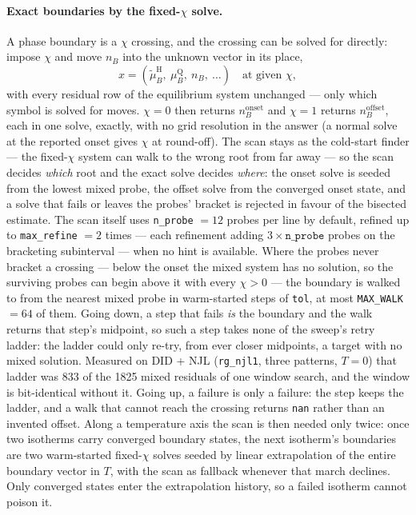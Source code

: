 \documentclass[aps,prc,onecolumn,superscriptaddress,nofootinbib,10pt]{revtex4-2}
\newcommand{\nB}{n_B}
\newcommand{\muB}{\mu_B}
\newcommand{\mutB}{\tilde\mu_B}
\newcommand{\phH}{\mathrm{H}}
\newcommand{\phQ}{\mathrm{Q}}
\begin{document}
\paragraph{Exact boundaries by the fixed-$\chi$ solve.} A phase boundary is a
$\chi$ crossing, and the crossing can be solved for directly: impose $\chi$
and move $\nB$ into the unknown vector in its place,
%
\begin{equation}
x = (\mutB^\phH,\ \muB^\phQ,\ \nB,\ \ldots) \quad \text{at given } \chi ,
\end{equation}
%
with every residual row of the equilibrium system unchanged --- only which
symbol is solved for moves. $\chi = 0$ then returns
$\nB^{\mathrm{onset}}$ and $\chi = 1$ returns $\nB^{\mathrm{offset}}$, each in
one solve, exactly, with no grid resolution in the answer (a normal solve at
the reported onset gives $\chi$ at round-off). The scan stays as the
cold-start finder --- the fixed-$\chi$ system can walk to the wrong root from
far away --- so the scan decides \emph{which} root and the exact solve
decides \emph{where}: the onset solve is seeded from the lowest mixed probe,
the offset solve from the converged onset state, and a solve that fails or
leaves the probes' bracket is rejected in favour of the bisected estimate. The
scan itself uses \texttt{n\_probe} $= 12$ probes per line by default, refined up
to \texttt{max\_refine} $= 2$ times --- each refinement adding
$3 \times \texttt{n\_probe}$ probes on the bracketing subinterval --- when no
hint is available. Where the probes never bracket a crossing --- below the
onset the mixed system has no solution, so the surviving probes can begin
above it with every $\chi > 0$ --- the boundary is walked to from the nearest
mixed probe in warm-started steps of \texttt{tol}, at most
\texttt{MAX\_WALK} $= 64$ of them. Going down, a step that fails \emph{is}
the boundary and the walk returns that step's midpoint, so such a step takes
none of the sweep's retry ladder: the ladder could only re-try, from ever
closer midpoints, a target with no mixed solution. Measured on DID + NJL
(\texttt{rg\_njl1}, three patterns, $T = 0$) that ladder was 833 of the 1825
mixed residuals of one window search, and the window is bit-identical without
it. Going up, a failure is only a failure: the step keeps the ladder, and a
walk that cannot reach the crossing returns \texttt{nan} rather than an
invented offset.
Along a temperature axis the scan is then needed only twice: once two
isotherms carry converged boundary states, the next isotherm's boundaries are
two warm-started fixed-$\chi$ solves seeded by linear extrapolation of the
entire boundary vector in $T$, with the scan as fallback whenever that march
declines. Only converged states enter the extrapolation history, so a failed
isotherm cannot poison it.
\end{document}
